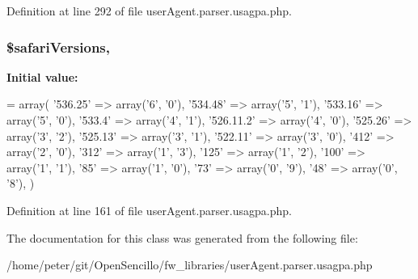 Definition at line 292 of file user\-Agent.\-parser.\-usagpa.\-php.

\hypertarget{class_user_agent_parser_a3493595b0af2ff79e44fe73847a67688}{
\subsubsection[{\$safari\-Versions}]{\setlength{\rightskip}{0pt plus 5cm}\$safari\-Versions\hspace{0.3cm}{\ttfamily [static]}, {\ttfamily [protected]}}}\label{class_user_agent_parser_a3493595b0af2ff79e44fe73847a67688}
{\bfseries Initial value\-:}
\begin{DoxyCode}
= array(
        \textcolor{stringliteral}{'536.25'}    => array(\textcolor{charliteral}{'6'}, \textcolor{charliteral}{'0'}),
        \textcolor{stringliteral}{'534.48'}    => array(\textcolor{charliteral}{'5'}, \textcolor{charliteral}{'1'}),
        \textcolor{stringliteral}{'533.16'}    => array(\textcolor{charliteral}{'5'}, \textcolor{charliteral}{'0'}),
        \textcolor{stringliteral}{'533.4'}     => array(\textcolor{charliteral}{'4'}, \textcolor{charliteral}{'1'}),
        \textcolor{stringliteral}{'526.11.2'}  => array(\textcolor{charliteral}{'4'}, \textcolor{charliteral}{'0'}),
        \textcolor{stringliteral}{'525.26'}    => array(\textcolor{charliteral}{'3'}, \textcolor{charliteral}{'2'}),
        \textcolor{stringliteral}{'525.13'}    => array(\textcolor{charliteral}{'3'}, \textcolor{charliteral}{'1'}),
        \textcolor{stringliteral}{'522.11'}    => array(\textcolor{charliteral}{'3'}, \textcolor{charliteral}{'0'}),
        \textcolor{stringliteral}{'412'}       => array(\textcolor{charliteral}{'2'}, \textcolor{charliteral}{'0'}),
        \textcolor{stringliteral}{'312'}       => array(\textcolor{charliteral}{'1'}, \textcolor{charliteral}{'3'}),
        \textcolor{stringliteral}{'125'}       => array(\textcolor{charliteral}{'1'}, \textcolor{charliteral}{'2'}),
        \textcolor{stringliteral}{'100'}       => array(\textcolor{charliteral}{'1'}, \textcolor{charliteral}{'1'}),
        \textcolor{stringliteral}{'85'}        => array(\textcolor{charliteral}{'1'}, \textcolor{charliteral}{'0'}),
        \textcolor{stringliteral}{'73'}        => array(\textcolor{charliteral}{'0'}, \textcolor{charliteral}{'9'}),
        \textcolor{stringliteral}{'48'}        => array(\textcolor{charliteral}{'0'}, \textcolor{charliteral}{'8'}),
    )
\end{DoxyCode}


Definition at line 161 of file user\-Agent.\-parser.\-usagpa.\-php.



The documentation for this class was generated from the following file\-:\begin{DoxyCompactItemize}
\item 
/home/peter/git/\-Open\-Sencillo/fw\-\_\-libraries/user\-Agent.\-parser.\-usagpa.\-php\end{DoxyCompactItemize}
